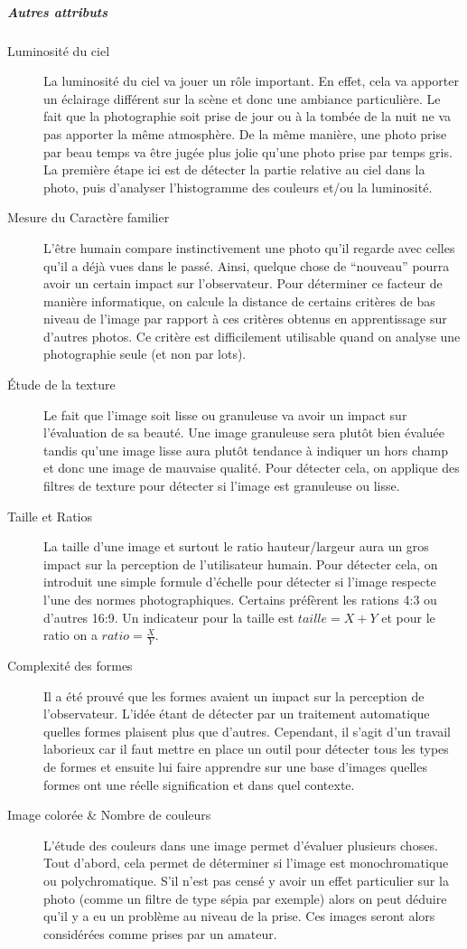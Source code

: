 \documentclass[11pt, french,screen]{report-rd-info}
\begin{document}
\subparagraph{Autres attributs}
\begin{description}

\item[Luminosité du ciel]
La luminosité du ciel va jouer un rôle important. En effet, cela va apporter un éclairage différent sur la scène et donc une ambiance particulière. Le fait que la photographie soit prise de jour ou à la tombée de la nuit ne va pas apporter la même atmosphère. De la même manière, une photo prise par beau temps va être jugée plus jolie qu’une photo prise par temps gris. La première étape ici est de détecter la partie relative au ciel dans la photo, puis d’analyser l’histogramme des couleurs et/ou la luminosité.
\item[Mesure du Caractère familier]
L’être humain compare instinctivement une photo qu’il regarde avec celles qu’il a déjà vues dans le passé. Ainsi, quelque chose de “nouveau” pourra avoir un certain impact sur l’observateur. Pour déterminer ce facteur de manière informatique, on calcule la distance de certains critères de bas niveau de l’image par rapport à ces critères obtenus en apprentissage sur d’autres photos. Ce critère est difficilement utilisable quand on analyse une photographie seule (et non par lots).
\item[Étude de la texture]
Le fait que l’image soit lisse ou granuleuse va avoir un impact sur l’évaluation de sa beauté. Une image granuleuse sera plutôt bien évaluée tandis qu’une image lisse aura plutôt tendance à indiquer un hors champ et donc une image de mauvaise qualité. Pour détecter cela, on applique des filtres de texture pour détecter si l’image est granuleuse ou lisse.
\item[Taille et Ratios]
La taille d’une image et surtout le ratio hauteur/largeur aura un gros impact sur la perception de l’utilisateur humain. Pour détecter cela, on introduit une simple formule d’échelle pour détecter si l’image respecte l’une des normes photographiques. Certains préfèrent les rations 4:3 ou d’autres 16:9. Un indicateur pour la taille est $taille = X+Y$ et pour le ratio on a $ratio = \frac{X}{Y}$.

\item[Complexité des formes]
Il a été prouvé que les formes avaient un impact sur la perception de l’observateur. L'idée étant de détecter par un traitement automatique quelles formes plaisent plus que d’autres. Cependant, il s’agit d’un travail laborieux car il faut mettre en place un outil pour détecter tous les types de formes et ensuite lui faire apprendre sur une base d’images quelles formes ont une réelle signification et dans quel contexte.
\item[Image colorée \& Nombre de couleurs]
L’étude des couleurs dans une image permet d’évaluer plusieurs choses. Tout d’abord, cela permet de déterminer si l’image est monochromatique  ou polychromatique. S’il n’est pas censé y avoir un effet particulier sur la photo (comme un filtre de type sépia par exemple) alors on peut déduire qu’il y a eu un problème au niveau de la prise. Ces images seront alors considérées comme prises par un amateur.


\end{description}
\end{document}
